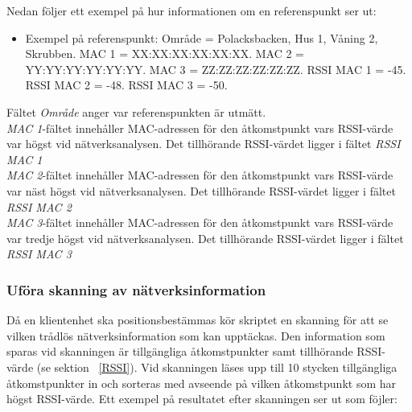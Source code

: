 \documentclass[a4paper,12pt]{article}
\begin{document}
 Nedan följer ett exempel på hur informationen om en referenspunkt ser ut:
 \begin{itemize}
   \item Exempel på referenspunkt:
         \newline Område = Polacksbacken, Hus 1, Våning 2, Skrubben.
         \newline MAC 1 = XX:XX:XX:XX:XX:XX.
         \newline MAC 2 = YY:YY:YY:YY:YY:YY.
         \newline MAC 3 = ZZ:ZZ:ZZ:ZZ:ZZ:ZZ.
         \newline RSSI MAC 1 = -45.
         \newline RSSI MAC 2 = -48.
         \newline RSSI MAC 3 = -50.
 \end{itemize}


 Fältet \textit{Område} anger var referenspunkten är utmätt. \\
 \textit{MAC 1}-fältet innehåller MAC-adressen för den åtkomstpunkt vars RSSI-värde var högst vid nätverksanalysen. Det tillhörande RSSI-värdet ligger i fältet \textit{RSSI MAC 1}\\
  \textit{MAC 2}-fältet innehåller MAC-adressen för den åtkomstpunkt vars RSSI-värde var näst högst vid nätverksanalysen. Det tillhörande RSSI-värdet ligger i fältet \textit{RSSI MAC 2}\\
   \textit{MAC 3}-fältet innehåller MAC-adressen för den åtkomstpunkt vars RSSI-värde var tredje högst vid nätverksanalysen. Det tillhörande RSSI-värdet ligger i fältet \textit{RSSI MAC 3}\\


 \subsubsection{Uföra skanning av nätverksinformation} \label{skanning}
 Då en klientenhet ska positionsbestämmas kör skriptet en skanning för att se vilken trådlös nätverksinformation som kan upptäckas. Den information som sparas vid skanningen är tillgängliga åtkomstpunkter samt tillhörande RSSI-värde (se sektion ~\ref{RSSI}). Vid skanningen läses upp till 10 stycken tillgängliga åtkomstpunkter in och sorteras med avseende på vilken åtkomstpunkt som har högst RSSI-värde. Ett exempel på resultatet efter skanningen ser ut som föjler:
\end{document}
